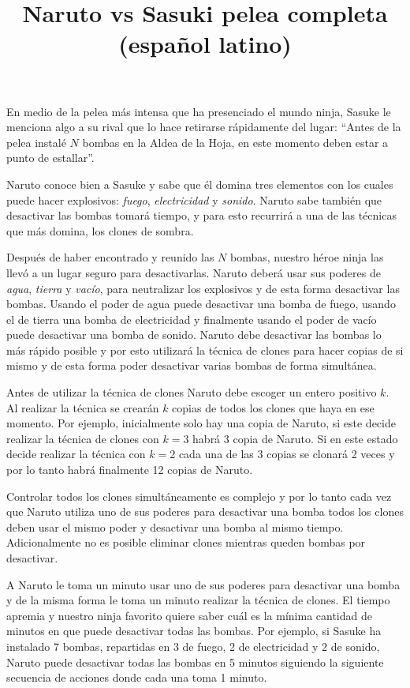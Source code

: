 \documentclass{oci}
\title{Naruto vs Sasuki pelea completa (español latino)}
\begin{document}
\begin{problemDescription}
En medio de la pelea más intensa que ha presenciado el mundo ninja, Sasuke le
menciona algo a su rival que lo hace retirarse rápidamente del lugar: ``Antes de
la pelea instalé $N$ bombas en la Aldea de la Hoja, en este momento deben estar
a punto de estallar''.

Naruto conoce bien a Sasuke y sabe que él domina tres elementos con los cuales
puede hacer explosivos: \emph{fuego}, \emph{electricidad} y \emph{sonido}.
Naruto sabe también que desactivar las bombas tomará tiempo, y para esto
recurrirá a una de las técnicas que más domina, los clones de sombra.

Después de haber encontrado y reunido las $N$ bombas, nuestro héroe ninja las
llevó a un lugar seguro para desactivarlas.
Naruto deberá usar sus poderes de \emph{agua}, \emph{tierra} y \emph{vacío},
para neutralizar los explosivos y de esta forma desactivar las bombas.
Usando el poder de agua puede desactivar una bomba de fuego, usando el de
tierra una bomba de electricidad y finalmente usando el poder de vacío puede
desactivar una bomba de sonido.
Naruto debe desactivar las bombas lo más rápido posible y por esto utilizará la
técnica de clones para hacer copias de si mismo y de esta forma poder
desactivar varias bombas de forma simultánea.

Antes de utilizar la técnica de clones Naruto debe escoger un entero positivo
$k$.
Al realizar la técnica se crearán $k$ copias de todos los clones que haya en ese
momento.
Por ejemplo, inicialmente solo hay una copia de Naruto, si este decide realizar
la técnica de clones con $k=3$ habrá 3 copia de Naruto.
Si en este estado decide realizar la técnica con $k=2$ cada una de las 3 copias
se clonará 2 veces y por lo tanto habrá finalmente 12 copias de Naruto.

Controlar todos los clones simultáneamente es complejo y por lo tanto cada vez
que Naruto utiliza uno de sus poderes para desactivar una bomba todos los clones
deben usar el mismo poder y desactivar una bomba al mismo tiempo.
Adicionalmente no es posible eliminar clones mientras queden bombas por
desactivar.

A Naruto le toma un minuto usar uno de sus poderes para desactivar una bomba
y de la misma forma le toma un minuto realizar la técnica de clones.
El tiempo apremia y nuestro ninja favorito quiere saber cuál es la mínima
cantidad de minutos en que puede desactivar todas las bombas.
Por ejemplo, si Sasuke ha instalado 7 bombas, repartidas en 3 de fuego, 2 de
electricidad y 2 de sonido, Naruto puede desactivar todas las bombas en 5
minutos siguiendo la siguiente secuencia de acciones donde cada una toma 1
minuto.


\end{problemDescription}
\end{document}
